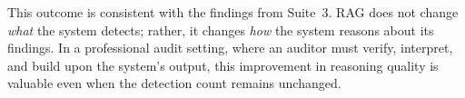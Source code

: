 This outcome is consistent with the findings from Suite~3. RAG does not change \emph{what} the system detects; rather, it changes \emph{how} the system reasons about its findings. In a professional audit setting, where an auditor must verify, interpret, and build upon the system's output, this improvement in reasoning quality is valuable even when the detection count remains unchanged.







